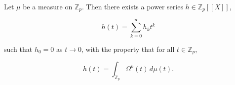 Let $\mu$ be a measure on $\mathbb{Z}_p$. Then there exists a power series $h \in \mathbb{Z}_p[[X]]$,

$$h(t) = \sum_{k=0}^{\infty} h_k t^k$$

such that $h_0 = 0$ as $t \to 0$, with the property that for all $t \in \mathbb{Z}_p$,

$$h(t) = \int_{\mathbb{Z}_p} \Omega^k(t) \, d\mu(t).$$
